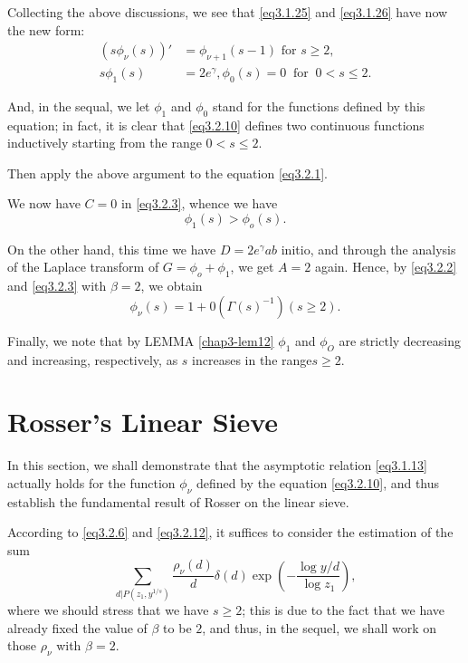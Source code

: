 Collecting the above discussions, we see that \eqref{eq3.1.25} and
\eqref{eq3.1.26} have now the new form: 
\begin{align*}
  (s \phi_\nu (s))' & = \phi_{\nu +1}(s-1) \text{ for } s \ge 2,\\
  s \phi_1 (s) & =  2e^\gamma, \phi_0(s) =0 ~\text{ for }~0 < s \le
  2. \tag{3.2.10} \label{eq3.2.10}
\end{align*}

And, in the sequal, we let $\phi_1$ and $\phi_0$ stand for the
functions defined by this equation; in fact, it is clear that
\eqref{eq3.2.10} defines two continuous functions inductively starting
from the range $0 < s \le 2$. 

Then apply the above argument to the equation \eqref{eq3.2.1}.

We now have $C=0$ in \eqref{eq3.2.3}, whence we have
\begin{equation*}
  \phi_1(s) > \phi_o(s). \tag{3.2.11}\label{eq3.2.11}
\end{equation*}

On the other hand, this time we have $D=2e^\gamma ab$ initio, and
through the analysis of the Laplace transform of $G = \phi_o+
\phi_1$, we get $A=2$ again. Hence, by \eqref{eq3.2.2} and
\eqref{eq3.2.3} with $\beta = 2$, we obtain 
\begin{equation*}
  \phi_\nu (s)=1+0(\Gamma(s)^{-1})(s \ge 2).\tag{3.2.12}\label{eq3.2.12}
\end{equation*}

Finally, we note that by LEMMA \ref{chap3-lem12} $\phi_1$ and $\phi_O$
are strictly decreasing and increasing, respectively, as $s$ increases
in the range\pageoriginale $s \ge 2$. 

\section{Rosser's Linear Sieve}\label{chap3-sec3.3}%

In this section, we shall demonstrate that the asymptotic relation
\eqref{eq3.1.13} actually holds for the function $\phi_\nu$ defined by the
equation \eqref{eq3.2.10}, and thus establish the fundamental result of Rosser
on the linear sieve. 

According to \eqref{eq3.2.6} and \eqref{eq3.2.12}, it suffices to
consider the estimation of the sum 
\begin{equation*}
  \sum_{d|P(z_1,y^{1/s})}\frac{\rho_\nu(d)}{d} \delta(d)
  \exp\left(-\frac{\log y/d}{\log z_1}\right), \tag{3.3.1}\label{eq3.3.1} 
\end{equation*}
where we should stress that we have $s \ge 2$; this is due to the fact
that we have already fixed the value of $\beta$ to be $2$, and thus,
in the sequel, we shall work on those $\rho_\nu$ with $\beta =2$. 

